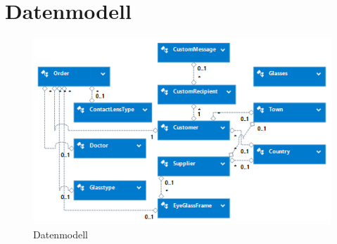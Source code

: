 \section{Datenmodell}
\begin{figure}[H]
\begin{center}
	\includegraphics[scale=1.05]{images/db_kurz.png}
\end{center}
	\caption{Datenmodell}
	\label{fig:sample}
\end{figure}
